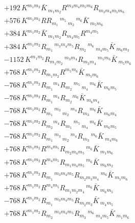 \begin{align}
  &+192\,K^{{m_{1}} {m_{2}}}\bar{K}\,_{{m_{1}} {m_{2}}} R^{{m_{3}} {m_{4}} {m_{5}} {m_{6}}} R_{{m_{3}} {m_{4}} {m_{5}} {m_{6}}} \\
  &+576\,K^{{m_{1}} {m_{2}}} R R_{{m_{1}}}\,^{{m_{5}}}\,_{{m_{2}}}\,^{{m_{6}}} \bar{K}\,_{{m_{5}} {m_{6}}}\\
  &+384\,K^{{m_{1}} {m_{2}}}\bar{K}\,_{{m_{1}} {m_{2}}} R_{m_4 m_5}R^{m_4 m_5}\\
  &+384\,K^{{m_{1}} {m_{2}}} R_{{m_{1}}}\,^{{m_{3}} {m_{4}} {m_{5}}} R_{{m_{2}}}\,^{{m_{6}}}\,_{{m_{4}} {m_{5}}} \bar{K}\,_{{m_{6}} {m_{3}}}\\
  &-1152\,K^{{m_{1}} {m_{2}}} R_{{m_{1}} {m_{2}}}\,^{{m_{3}} {m_{4}}} R_{{m_{3}} {m_{4}}}\,^{{m_{5}} {m_{6}}} \bar{K}\,_{{m_{5}} {m_{6}}}\\
  &+768\,K^{{m_{1}} {m_{2}}} R_{m_1 m_2} R^{m_5 m_6} \bar{K}\,_{{m_{5}} {m_{6}}}\\
  &-768\,K^{{m_{1}} {m_{2}}} R_{m_1}{}^{m_4} R_{{m_{2}}}\,^{{m_{5}}}\,_{{m_{4}}}\,^{{m_{6}}} \bar{K}\,_{{m_{6}} {m_{5}}}\\
  &-768\,K^{{m_{1}} {m_{2}}} R_{m_1}{}^{m_4} R_{m_2}{}^{m_6} \bar{K}\,_{{m_{6}} {m_{4}}}\\
  &-768\,K^{{m_{1}} {m_{2}}} R_{{m_{1}}}\,^{{m_{3}}}\,_{{m_{2}}}\,^{{m_{4}}} R_{m_3}{}^{m_6} \bar{K}\,_{{m_{6}} {m_{4}}}\\
  &-768\,K^{{m_{1}} {m_{2}}} R_{{m_{2}}}{}^{{m_{4}}} R_{{m_{1}}}\,^{{m_{5}}}\,_{{m_{4}}}\,^{{m_{6}}} \bar{K}\,_{{m_{6}} {m_{5}}}\\
  &-768\,K^{{m_{1}} {m_{2}}} R_{{m_{1}}}\,^{{m_{3}}}\,_{{m_{2}}}\,^{{m_{4}}} R_{{m_{3}}}\,^{{m_{6}}} \bar{K}\,_{{m_{4}} {m_{6}}}\\
  &+768\,K^{{m_{1}} {m_{2}}} R^{m_4 m_5} R_{{m_{2}} {m_{4}} {m_{5}}}\,^{{m_{6}}} \bar{K}\,_{{m_{1}} {m_{6}}}\\
  &+768\,K^{{m_{1}} {m_{2}}} R^{m_4 m_5} R_{{m_{1}} {m_{4}} {m_{5}}}\,^{{m_{6}}} \bar{K}\,_{{m_{6}} {m_{2}}}\\
  &+768\,K^{{m_{1}} {m_{2}}} R_{{m_{1}}}\,^{{m_{3}} {m_{4}} {m_{5}}} R_{{m_{2}} {m_{3}} {m_{4}}}\,^{{m_{6}}} \bar{K}\,_{{m_{5}} {m_{6}}}\\
  &+768\,K^{{m_{1}} {m_{2}}} R^{m_4 m_5} R_{{m_{1}} {m_{2}} {m_{4}}}\,^{{m_{6}}} \bar{K}\,_{{m_{6}} {m_{5}}}\\
  &-768\,K^{{m_{1}} {m_{2}}} R_{{m_{1}}}\,^{{m_{3}} {m_{4}} {m_{5}}} R_{m_2 m_3} \bar{K}\,_{{m_{4}} {m_{5}}}\\
  &+768\,K^{{m_{1}} {m_{2}}} R_{{m_{2}}}\,^{{m_{3}} {m_{4}} {m_{5}}} R_{{m_{3}}}\,^{{m_{6}}}\,_{{m_{4}} {m_{5}}} \bar{K}\,_{{m_{1}} {m_{6}}}\\

\end{align}
